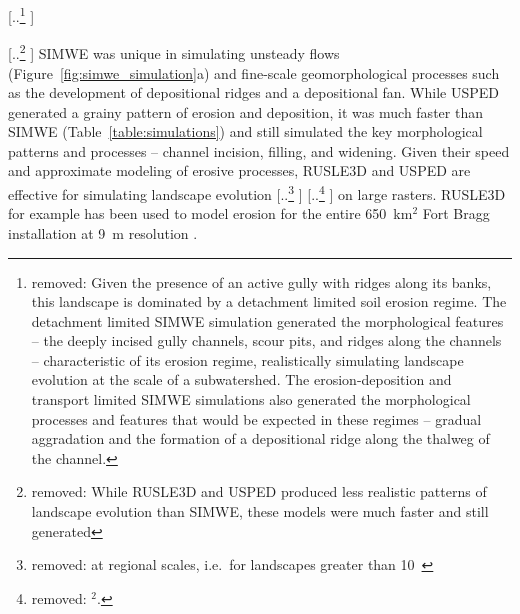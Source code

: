 \documentclass[gmd, manuscript]{copernicus}
\providecommand{\DIFadd}[1]{{\protect\color{blue} \sf #1}} %
\providecommand{\DIFdel}[1]{{\protect\color{red} [..\footnote{removed: #1} ]}} %
\providecommand{\DIFaddbegin}{} %
\providecommand{\DIFaddend}{} %
\providecommand{\DIFdelbegin}{} %
\providecommand{\DIFdelend}{} %
\begin{document}
\DIFdelbegin \DIFdel{Given the presence of an active gully 
with ridges along its banks,
this landscape is dominated by 
a detachment limited soil erosion regime.
The detachment limited SIMWE simulation generated the morphological features
-- the deeply incised gully channels, 
scour pits,
and ridges along the channels 
--
characteristic of its erosion regime,
realistically simulating landscape evolution 
at the scale of a subwatershed. 
The erosion-deposition and transport limited 
SIMWE simulations also generated 
the morphological processes and features
that would be expected in these regimes
-- gradual aggradation
and the formation of a depositional ridge 
along the thalweg of the channel. 
}%

\DIFdel{While RUSLE3D and USPED produced less realistic patterns of landscape evolution
than SIMWE,
these models were much faster and still generated
}\DIFdelend \DIFaddbegin \DIFadd{SIMWE was unique in simulating unsteady flows 
(Figure~\ref{fig:simwe_simulation}a)
and fine-scale geomorphological processes 
such as the development of depositional ridges 
and a depositional fan. 
While USPED generated a grainy pattern of erosion and deposition,
it was much faster than SIMWE 
(Table~\ref{table:simulations})
and still simulated 
}\DIFaddend the key morphological patterns and processes -- 
channel incision, filling, and widening. 
%
Given their speed
and approximate modeling of erosive processes, 
RUSLE3D and USPED 
are effective for simulating landscape evolution
\DIFdelbegin \DIFdel{at regional scales, 
i.e.~for landscapes greater than 10~}%
\DIFdel{$^{2}$.
}\DIFdelend \DIFaddbegin \DIFadd{on large rasters.
}\DIFaddend RUSLE3D for example has been used to
model erosion for the entire 650~\unit{km}$^{2}$ 
Fort Bragg installation at 9~\unit{m} resolution
\citep{Levine2018}. 
\end{document}
